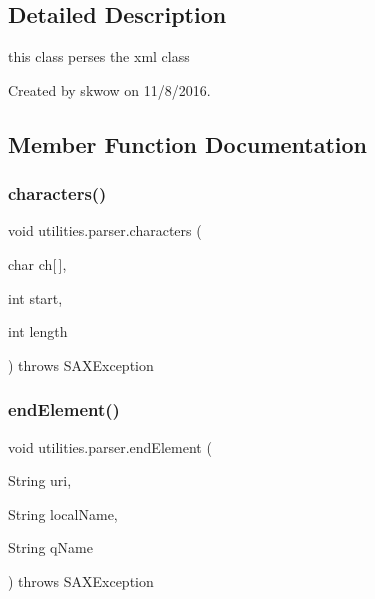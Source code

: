\subsection{Detailed Description}
this class perses the xml class 

Created by skwow on 11/8/2016. 

\subsection{Member Function Documentation}
\hypertarget{classutilities_1_1parser_aaf564dc89d2e86903538e014323d1482}{}\label{classutilities_1_1parser_aaf564dc89d2e86903538e014323d1482} 
\subsubsection{\texorpdfstring{characters()}{characters()}}
{\footnotesize\ttfamily void utilities.\+parser.\+characters (\begin{DoxyParamCaption}\item[{char}]{ch\mbox{[}$\,$\mbox{]},  }\item[{int}]{start,  }\item[{int}]{length }\end{DoxyParamCaption}) throws S\+A\+X\+Exception}

\hypertarget{classutilities_1_1parser_a63a7843809987e45e5bb9bb790a1c8ff}{}\label{classutilities_1_1parser_a63a7843809987e45e5bb9bb790a1c8ff} 
\subsubsection{\texorpdfstring{end\+Element()}{endElement()}}
{\footnotesize\ttfamily void utilities.\+parser.\+end\+Element (\begin{DoxyParamCaption}\item[{String}]{uri,  }\item[{String}]{local\+Name,  }\item[{String}]{q\+Name }\end{DoxyParamCaption}) throws S\+A\+X\+Exception}

\hypertarget{classutilities_1_1parser_aca9b03d52069091a9fbe48ca5723a52c}{}\label{classutilities_1_1parser_aca9b03d52069091a9fbe48ca5723a52c} 
